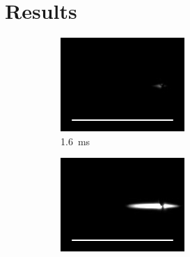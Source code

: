 \chapter{Results}
    
    \begin{figure}[h]
        \centering
        \begin{subfigure}[t]{0.3\textwidth}
            \centering
            \includegraphics[width=\textwidth]{assets/5 results/ignitionFrames/16.jpg}
            \caption{\qty{1.6}{ms}}
            \label{fig:ignition_frames_16}
        \end{subfigure}
        \hfill
        \begin{subfigure}[t]{0.3\textwidth}
            \centering
            \includegraphics[width=\textwidth]{assets/5 results/ignitionFrames/17.jpg}

\end{subfigure}
\end{figure}

